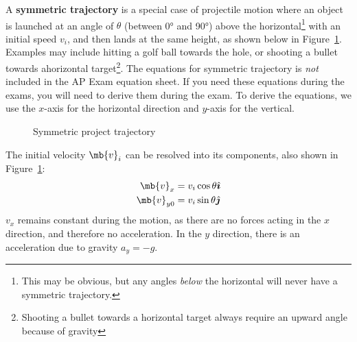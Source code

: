 \documentclass{../../../Physics.12/ossphys}
\begin{document}

\begin{center}
\end{center}

A \textbf{symmetric trajectory} is a special case of projectile motion where an
object is launched at an angle of $\theta$ (between \ang{0} and \ang{90}) above
the horizontal\footnote{This may be obvious, but any angles \emph{below} the 
  horizontal will never have a symmetric trajectory.} with an initial speed
$v_i$, and then lands at the same height, as shown below in Figure~\ref{sym}.
Examples may include hitting a golf ball towards the hole, or shooting a bullet
towards ahorizontal target\footnote{Shooting a bullet towards a horizontal
  target always require an upward angle because of gravity}. The equations for
symmetric trajectory is \emph{not} included in the AP Exam equation sheet.
If you need these equations during the exams, you will need to derive them
during the exam. To derive the equations, we use the $x$-axis for the
horizontal direction and $y$-axis for the vertical.
\begin{figure}[ht]
  \begin{center}
  \end{center}
  \vspace{-.2in}
  \caption{Symmetric project trajectory}
  \label{sym}
\end{figure}

The initial velocity $\mb{v}_i$ can be resolved into its components, also shown
in Figure~\ref{sym}:
\begin{align*}
  \mb{v}_x   &=v_i\cos\theta\hat{\bm{\imath}}\\
  \mb{v}_{y0}&=v_i\sin\theta\hat{\bm{\jmath}}
\end{align*}
$v_x$ remains constant during the motion, as there are no forces acting in the
$x$ direction, and therefore no acceleration. In the $y$ direction, there is an
acceleration due to gravity $a_y=-g$.
\end{document}
